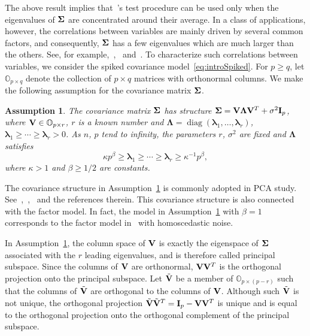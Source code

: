 \documentclass[3p]{elsarticle}
\DeclareMathOperator{\mydiag}{diag}
\newcommand{\bfsym}[1]{\ensuremath{\boldsymbol{#1}}}
\def\blambda {\bfsym {\lambda}}        \def\bLambda {\bfsym {\Lambda}}
\theoremstyle{plain}
\newtheorem{assumption}{\quad\quad Assumption}
\theoremstyle{definition}
\theoremstyle{remark}
\begin{document}
    The above result implies that~\cite{Chen2010A}'s test procedure can be used only when the eigenvalues of $\bSigma$ are concentrated around their average. 
   In a class of applications, however, the correlations between variables are mainly driven by several common factors, and consequently, $\bSigma$ has a few eigenvalues which are much larger than the others.
    See, for example,~\cite{Jung2009PCA},~\cite{Cai2012Sparse} and~\cite{Fan2015Asymptotics}.
To characterize such correlations between variables, we consider the  spiked covariance model~\eqref{eq:introSpiked}.
For $p\geq q$, let $\mathbb{O}_{p\times q}$ denote the collection of $p\times q$ matrices with orthonormal columns.
We make the following assumption for the covariance matrix $\bSigma$.
\begin{assumption}\label{theModel}
    The covariance matrix $\bSigma$ has structure $ \bSigma=\BV\bLambda \BV^T+\sigma^2 \BI_p$, where $\mathbf{V}\in\mathbb{O}_{p\times r}$, $r$ is a known number and $\bLambda=\mydiag(\blambda_{1},\ldots,\blambda_{r})$, 
 $\blambda_{1}\geq \cdots \geq \blambda_{r}>0$.
As $n$, $p$ tend to infinity, the parameters
$r$, $\sigma^2$ are fixed and $\bLambda$ satisfies     
    \begin{equation*}
        \kappa p^{\beta}\geq \blambda_{1}\geq \cdots \geq\blambda_{r}\geq \kappa^{-1}p^{\beta},
\end{equation*}
where $\kappa>1$ and $\beta\geq {1}/{2}$ are constants.
\end{assumption}

The covariance structure in Assumption~\ref{theModel} is commonly adopted in PCA study.
See~\cite{Cai2012Sparse},~\cite{Birnbaum2013},~\cite{Passemier2015} and the references therein.
This covariance structure is also connected with the factor model.
In fact, the model in Assumption~\ref{theModel} with $\beta=1$
corresponds to the factor model in~\cite{Ma2015A} with homoscedastic noise.

In Assumption~\ref{theModel}, the column space of $\mathbf{V}$ is exactly the eigenspace of $\bSigma$ associated with the $r$ leading eigenvalues, and is therefore called principal subspace. Since the columns of $\mathbf{V}$ are orthonormal, $\mathbf{V} \mathbf{V}^T$ is the orthogonal projection onto the principal subspace.
Let $\tilde{\mathbf{V}}$ be a member of $\mathbb{O}_{p\times (p-r)}$ such that the columns of $\tilde{\mathbf{V}}$ are orthogonal to the columns of  $\mathbf{V}$.
 Although such $\tilde{\mathbf{V}}$ is not unique, the orthogonal projection  $\tilde{\mathbf{V}}\tilde{\mathbf{V}}^T=\mathbf{I}_p-\mathbf{V} \mathbf{V}^T$ is unique and is equal to the orthogonal projection onto the orthogonal complement of the principal subspace.
\end{document}
